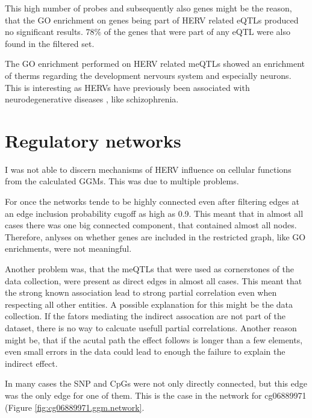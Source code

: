 \documentclass[a4paper,12pt,twoside,openright]{report}
\begin{document}
This high number of probes and subsequently also genes might be the reason, that the GO enrichment on genes being part of HERV related eQTLs produced no significant results. 78\% of the genes that were part of any eQTL were also found in the filtered set.

The GO enrichment performed on HERV related meQTLs showed an enrichment of therms regarding the development nervours system and especially neurons. This is interesting as HERVs have previously been associated with neurodegenerative diseases \cite{Mortelmans2016}, like schizophrenia\cite{10.3389/fpsyt.2015.00183}.

\section{Regulatory networks}
\label{Discussion:Regulatory networks}


I was not able to discern mechanisms of HERV influence on cellular functions from the calculated GGMs. This was due to multiple problems. 

For once the networks tende to be highly connected even after filtering edges at an edge inclusion probability cugoff as high as 0.9. This meant that in almost all cases there was one big connected component, that contained almost all nodes. Therefore, anlyses on whether genes are included in the restricted graph, like GO enrichments, were not meaningful. 

Another problem was, that the meQTLs that were used as cornerstones of the data collection, were present as direct edges in almost all cases. This meant that the strong known association lead to strong partial correlation even when respecting all other entities. A possible explanation for this might be the data collection. If the fators mediating the indirect assocation are not part of the dataset, there is no way to calcuate usefull partial correlations. Another reason might be, that if the acutal path the effect follows is longer than a few elements, even small errors in the data could lead to enough the failure to explain the indirect effect. 

In many cases the SNP and CpGs were not only directly connected, but this edge was the only edge for one of them. This is the case in the network for cg06889971 (Figure \ref{fig:cg06889971.ggm.network}.
\end{document}
